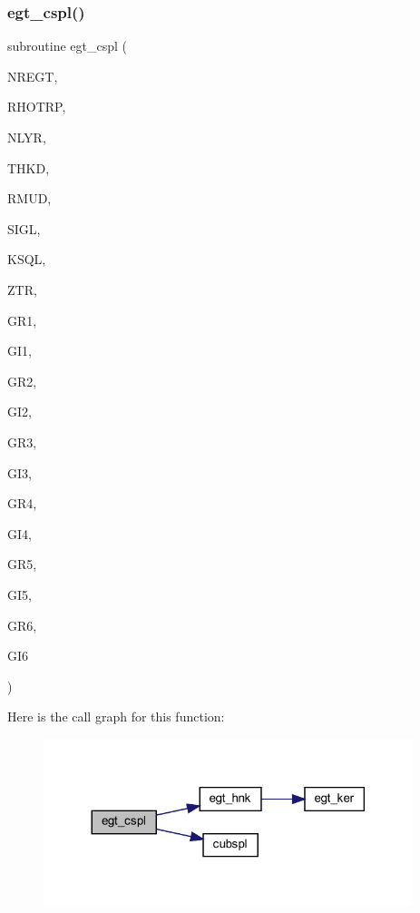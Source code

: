 \subsubsection{\texorpdfstring{egt\+\_\+cspl()}{egt\_cspl()}}
{\footnotesize\ttfamily subroutine egt\+\_\+cspl (\begin{DoxyParamCaption}\item[{integer}]{N\+R\+E\+GT,  }\item[{real, dimension(nregt)}]{R\+H\+O\+T\+RP,  }\item[{integer}]{N\+L\+YR,  }\item[{real (kind=ql), dimension(nlyr)}]{T\+H\+KD,  }\item[{real (kind=ql), dimension(0\+:nlyr)}]{R\+M\+UD,  }\item[{complex(kind=ql), dimension(nlyr)}]{S\+I\+GL,  }\item[{complex(kind=ql), dimension(nlyr)}]{K\+S\+QL,  }\item[{real}]{Z\+TR,  }\item[{real, dimension (4,nregt)}]{G\+R1,  }\item[{real, dimension (4,nregt)}]{G\+I1,  }\item[{real, dimension (4,nregt)}]{G\+R2,  }\item[{real, dimension (4,nregt)}]{G\+I2,  }\item[{real, dimension (4,nregt)}]{G\+R3,  }\item[{real, dimension (4,nregt)}]{G\+I3,  }\item[{real, dimension (4,nregt)}]{G\+R4,  }\item[{real, dimension (4,nregt)}]{G\+I4,  }\item[{real, dimension (4,nregt)}]{G\+R5,  }\item[{real, dimension (4,nregt)}]{G\+I5,  }\item[{real, dimension (4,nregt)}]{G\+R6,  }\item[{real, dimension (4,nregt)}]{G\+I6 }\end{DoxyParamCaption})}

Here is the call graph for this function\+:\nopagebreak
\begin{figure}[H]
\begin{center}
\leavevmode
\includegraphics[width=305pt]{Leroi__c_8f90_a39b25039701be699f724d2a872d3d3f3_cgraph}
\end{center}
\end{figure}
\mbox{\label{Leroi__c_8f90_ae50e88569c7037d3d431d0b0dd30c795}} 
